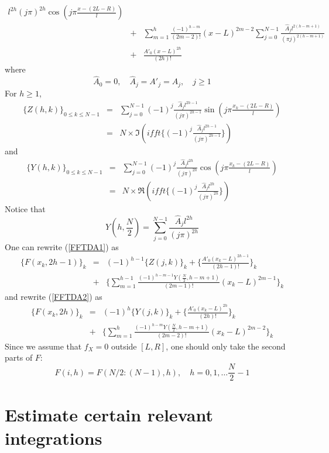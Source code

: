 \documentclass[numreferences]{kluwer}    %
\begin{document}
\begin{article}
\begin{eqnarray}
{l^{2h}}{(j\pi)^{2h}}\cos(j\pi\frac{x-(2L-R)}{l}) \nonumber\\
&+&\sum_{m=1}^{h}\frac{(-1)^{h-m}}{(2m-2)!}(x-L)^{2m-2}\sum_{j=0}^{N-1}\frac{\hat{A}_jl^{2(h-m+1)}}{(\pi
j)^{2(h-m+1)}}\nonumber\\
&+&\frac{A'_0(x-L)^{2h}}{(2h)!} \label{FFTDA2} 
\end{eqnarray}
where
\[
\hat{A}_0 = 0,\quad \hat{A}_j = A'_j=A_j, \quad j\ge 1
\]
For $h \ge 1$, 
\begin{eqnarray*}
\{Z(h,k)\}_{0\le k \le N-1} &=& \sum_{j=0}^{N-1}(-1)^j\frac{\hat{A}_j
l^{2h-1}}{(j\pi)^{2h-1}}   \sin(j\pi\frac{x_k-(2L-R)}{l})\\
&=&N\times \Im (ifft\{ (-1)^j \frac{\hat{A}_j
l^{2h-1}}{(j\pi)^{2h-1}} \})
\end{eqnarray*}
and
\begin{eqnarray*}
\{Y(h,k)\}_{0\le k \le N-1} &=& \sum_{j=0}^{N-1}(-1)^j\frac{\hat{A}_j
l^{2h}}{(j\pi)^{2h}}   \cos(j\pi\frac{x_k-(2L-R)}{l})\\
&=&N\times \Re (ifft\{ (-1)^j \frac{\hat{A}_j
l^{2h}}{(j\pi)^{2h}} \})
\end{eqnarray*}
Notice that
\[
Y(h,\frac{N}2)=\sum_{j=0}^{N-1}\frac{\hat{A}_j
l^{2h}}{(j\pi)^{2h}} 
\]
One can rewrite (\ref{FFTDA1}) as
\begin{eqnarray}
  \{F(x_k,2h-1)\}_k &=& (-1)^{h-1} \{Z(j,k)\}_k + \{\frac{A'_0(x_k-L)^{2h-1}}{(2h-1)!}\}_k \label{FFTDA11} \\
&+& \{\sum_{m=1}^{h-1}\frac{(-1)^{h-m-1}Y(\frac{N}2,h-m+1)}{(2m-1)!} (x_k-L)^{2m-1}\}_k\nonumber
\end{eqnarray}
and rewrite (\ref{FFTDA2}) as
\begin{eqnarray}
  \{F(x_k,2h)\}_k &=& (-1)^{h} \{Y(j,k)\}_k + \{\frac{A'_0(x_k-L)^{2h}}{(2h)!}\}_k \label{FFTDA22} \\
&+& \{\sum_{m=1}^{h}\frac{(-1)^{h-m}Y(\frac{N}2,h-m+1)}{(2m-2)!} (x_k-L)^{2m-2}\}_k\nonumber
\end{eqnarray}
Since we assume that $f_X=0$ outside $[L,R]$, one should only take the second parts of $F$:
\[
F(i,h)=F(N/2:(N-1),h), \quad h=0,1,\dots \frac{N}2-1
\]
\section{Estimate certain relevant integrations}

\end{article}
\end{document}
